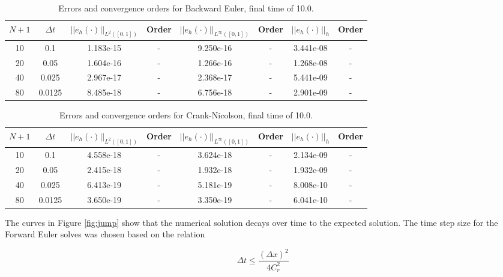 \documentclass[a4paper, 12pt]{article}
\begin{document}
\begin{table}[H]
\caption{Errors and convergence orders for Backward Euler, final time of 10.0.}
\vspace{0.1in}
\centering
\begin{tabular}{|c|c|c|c| c| c| c| c|}
\hline
 $N+1$  & $\Delta t$ & $||e_h(\cdot)||_{L^2([0,1])}$ & Order  & $||e_h(\cdot)||_{L^\infty([0,1])}$ & Order& $||e_h(\cdot)||_h$& Order \\
 \hline            %
     10  & 0.1     & 1.183e-15 & - & 9.250e-16 & - & 3.441e-08 & -\\
     20  & 0.05    & 1.604e-16 & - & 1.266e-16 & - & 1.268e-08 & -\\
     40  & 0.025   & 2.967e-17 & - & 2.368e-17 & - & 5.441e-09 & -\\
     80  & 0.0125  & 8.485e-18 & - & 6.756e-18 & - & 2.901e-09 & -\\
\hline
\end{tabular}
\label{tab:beT10}
\end{table}

\begin{table}[H]
\caption{Errors and convergence orders for Crank-Nicolson, final time of 10.0.}
\vspace{0.1in}
\centering
\begin{tabular}{|c|c|c|c| c| c| c| c|}
\hline
 $N+1$  & $\Delta t$ &  $||e_h(\cdot)||_{L^2([0,1])}$ & Order  & $||e_h(\cdot)||_{L^\infty([0,1])}$ & Order& $||e_h(\cdot)||_h$& Order \\
 \hline           %
     10  & 0.1    & 4.558e-18 & - & 3.624e-18 & - & 2.134e-09 & -\\
     20  & 0.05   & 2.415e-18 & - & 1.932e-18 & - & 1.932e-09 & -\\
     40  & 0.025  & 6.413e-19 & - & 5.181e-19 & - & 8.008e-10 & -\\
     80  & 0.0125 & 3.650e-19 & - & 3.350e-19 & - & 6.041e-10 & -\\
\hline
\end{tabular}
\label{tab:cnT10}
\end{table}

The curves in Figure \ref{fig:jump} show that the 
numerical solution decays over time to the expected solution.
The time step size for the Forward Euler solves was chosen based
on the relation

\begin{equation}
  \Delta t \leq \frac{ (\Delta x)^2} {4 C_r^2}
\end{equation}
\end{document}
